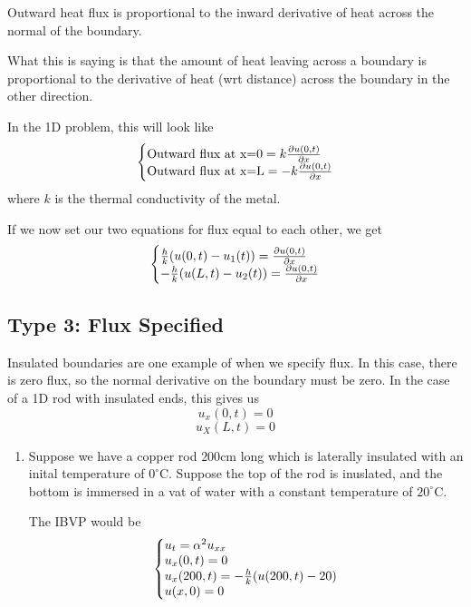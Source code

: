 \documentclass{article}
\begin{document}
\begin{proposition}
Outward heat flux is proportional to the inward derivative of heat across the normal of the boundary.
\end{proposition}

What this is saying is that the amount of heat leaving across a boundary is proportional to the derivative of heat (wrt distance) across the boundary in the other direction. 

In the 1D problem, this will look like $$\left\{\begin{array}{@{}l@{}} \text{Outward flux at x=0} = k \frac{\partial u(0,t)}{\partial x} \\ \text{Outward flux at x=L} = -k \frac{\partial u(0,t)}{\partial x}\end{array}\right.$$where $k$ is the thermal conductivity of the metal. 

If we now set our two equations for flux equal to each other, we get $$\left\{\begin{array}{@{}l@{}} \frac{h}{k}(u(0,t) - u_1(t)) =  \frac{\partial u(0,t)}{\partial x} \\ -\frac{h}{k}(u(L,t) - u_2(t)) = \frac{\partial u(0,t)}{\partial x}\end{array}\right.$$

\subsection{Type 3: Flux Specified}

Insulated boundaries are one example of when we specify flux. In this case, there is zero flux, so the normal derivative on the boundary must be zero. In the case of a 1D rod with insulated ends, this gives us $$u_x(0,t) = 0$$$$u_X(L,t) = 0$$

\begin{example}
\begin{enumerate}
    \item Suppose we have a copper rod $200$cm long which is laterally insulated with an inital temperature of $0^\circ$C. Suppose the top of the rod is inuslated, and the bottom is immersed in a vat of water with a constant temperature of $20^\circ$C. 
    
    The IBVP would be $$\left\{\begin{array}{@{}l@{}}u_t = \alpha^2u_{xx} \\ u_x(0,t) = 0 \\ u_x(200,t) = -\frac{h}{k}(u(200,t)-20) \\ u(x,0) = 0\end{array}\right.$$
\end{enumerate}
\end{example}
\end{document}
